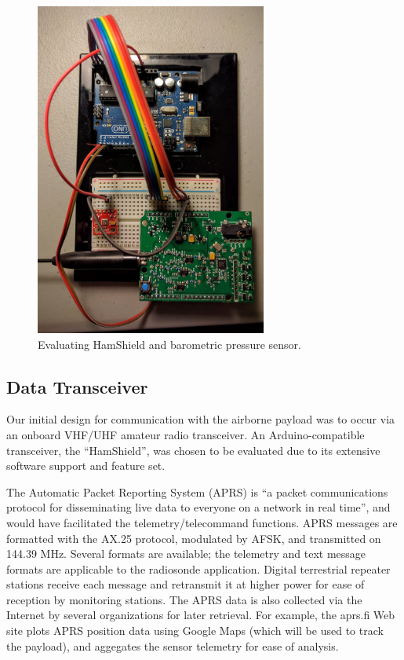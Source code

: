 \documentclass[conference,compsoc]{IEEEtran}
\begin{document}
\begin{figure}[!t]
\centering
\includegraphics[width=3in]{hamshield.jpg}
\caption{Evaluating HamShield and barometric pressure sensor.}
\label{fig_sim}
\end{figure}

\subsection{Data Transceiver}
Our initial design for communication with the airborne payload was to occur via an onboard VHF/UHF amateur radio transceiver. An Arduino-compatible transceiver, the “HamShield”, was chosen to be evaluated due to its extensive software support and feature set.

The Automatic Packet Reporting System (APRS) is “a packet communications protocol for disseminating live data to everyone on a network in real time”, and would have facilitated the telemetry/telecommand functions.  APRS messages are formatted with the AX.25 protocol, modulated by AFSK, and transmitted on 144.39 MHz. Several formats are available; the telemetry and text message formats are applicable to the radiosonde application. Digital terrestrial repeater stations receive each message and retransmit it at higher power for ease of reception by monitoring stations.  The APRS data is also collected via the Internet by several organizations for later retrieval.  For example, the aprs.fi Web site plots APRS position data using Google Maps (which will be used to track the payload), and aggegates the sensor telemetry for ease of analysis.
\end{document}
